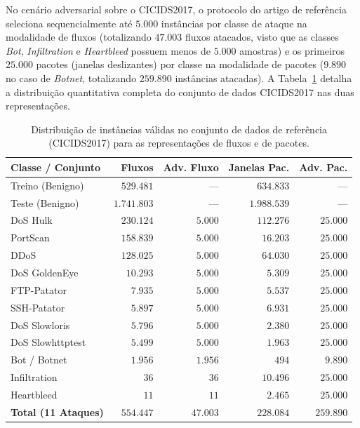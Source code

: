 \documentclass[conference]{IEEEtran}
\begin{document}
No cenário adversarial sobre o CICIDS2017, o protocolo do artigo de referência seleciona sequencialmente até $5.000$ instâncias por classe de ataque na modalidade de fluxos (totalizando $47.003$ fluxos atacados, visto que as classes \textit{Bot}, \textit{Infiltration} e \textit{Heartbleed} possuem menos de $5.000$ amostras) e os primeiros $25.000$ pacotes (janelas deslizantes) por classe na modalidade de pacotes ($9.890$ no caso de \textit{Botnet}, totalizando $259.890$ instâncias atacadas).
A Tabela~\ref{tab:cicids2017_dist} detalha a distribuição quantitativa completa do conjunto de dados CICIDS2017 nas duas representações.

\begin{table}[!t]
\centering
\footnotesize
\setlength{\tabcolsep}{3.5pt}
\caption{Distribuição de instâncias válidas no conjunto de dados de referência (CICIDS2017) para as representações de fluxos e de pacotes.}
\label{tab:cicids2017_dist}
\begin{tabular}{@{}>{\raggedright\arraybackslash}p{2.3cm}rrrr@{}}
\toprule
\textbf{Classe / Conjunto} & \textbf{Fluxos} & \textbf{Adv. Fluxo} & \textbf{Janelas Pac.} & \textbf{Adv. Pac.} \\
\midrule
Treino (Benigno) & $529.481$ & --- & $634.833$ & --- \\
Teste (Benigno) & $1.741.803$ & --- & $1.988.539$ & --- \\
\midrule
DoS Hulk & $230.124$ & $5.000$ & $112.276$ & $25.000$ \\
PortScan & $158.839$ & $5.000$ & $16.203$ & $25.000$ \\
DDoS & $128.025$ & $5.000$ & $64.030$ & $25.000$ \\
DoS GoldenEye & $10.293$ & $5.000$ & $5.309$ & $25.000$ \\
FTP-Patator & $7.935$ & $5.000$ & $5.537$ & $25.000$ \\
SSH-Patator & $5.897$ & $5.000$ & $6.931$ & $25.000$ \\
DoS Slowloris & $5.796$ & $5.000$ & $2.380$ & $25.000$ \\
DoS Slowhttptest & $5.499$ & $5.000$ & $1.963$ & $25.000$ \\
Bot / Botnet & $1.956$ & $1.956$ & $494$ & $9.890$ \\
Infiltration & $36$ & $36$ & $10.496$ & $25.000$ \\
Heartbleed & $11$ & $11$ & $2.465$ & $25.000$ \\
\midrule
\textbf{Total (11 Ataques)} & $\mathbf{554.447}$ & $\mathbf{47.003}$ & $\mathbf{228.084}$ & $\mathbf{259.890}$ \\
\bottomrule
\end{tabular}
\end{table}
\end{document}
